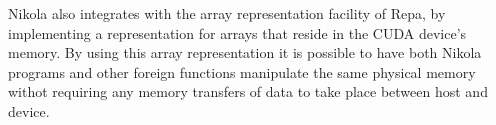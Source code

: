 Nikola also integrates with the array representation facility of Repa, by
implementing a representation for arrays that reside in the CUDA device's
memory. By using this array representation it is possible to have both Nikola
programs and other foreign functions manipulate the same physical memory withot
requiring any memory transfers of data to take place between host and device.

